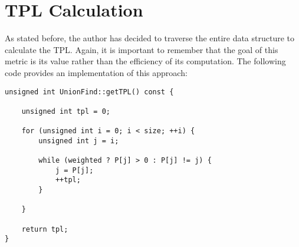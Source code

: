 \section{TPL Calculation}\label{ap:TPL}
As stated before, the author has decided to traverse the entire data structure to calculate the TPL. Again, it is important to remember that the goal of this metric is its value rather than the efficiency of its computation. The following code provides an implementation of this approach:

\begin{verbatim}
unsigned int UnionFind::getTPL() const {

    unsigned int tpl = 0;

    for (unsigned int i = 0; i < size; ++i) {
        unsigned int j = i;

        while (weighted ? P[j] > 0 : P[j] != j) {
            j = P[j];
            ++tpl;
        }

    }

    return tpl;
}
\end{verbatim}
